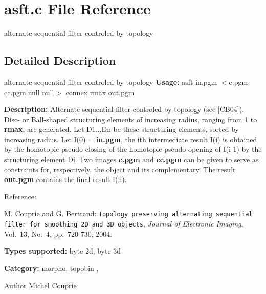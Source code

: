 \section{asft.c File Reference}
\label{asft_8c}


alternate sequential filter controled by topology  




\subsection{Detailed Description}
alternate sequential filter controled by topology {\bfseries Usage:} asft in.pgm $<$c.pgm cc.pgm$|$null null$>$ connex rmax out.pgm

{\bfseries Description:} Alternate sequential filter controled by topology (see [CB04]). Disc-\/ or Ball-\/shaped structuring elements of increasing radius, ranging from 1 to {\bfseries rmax}, are generated. Let D1...Dn be these structuring elements, sorted by increasing radius. Let I(0) = {\bfseries in.pgm}, the ith intermediate result I(i) is obtained by the homotopic pseudo-\/closing of the homotopic pseudo-\/opening of I(i-\/1) by the structuring element Di. Two images {\bfseries c.pgm} and {\bfseries cc.pgm} can be given to serve as constraints for, respectively, the object and its complementary. The result {\bfseries out.pgm} contains the final result I(n).

Reference:\par
 [CB04] M. Couprie and G. Bertrand: {\tt Topology preserving alternating sequential filter for smoothing 2D and 3D objects}, {\itshape  Journal of Electronic Imaging\/}, Vol.~13, No.~4, pp.~720-\/730, 2004.

{\bfseries Types supported:} byte 2d, byte 3d

{\bfseries Category:} morpho, topobin ,

\begin{DoxyAuthor}{Author}
Michel Couprie 
\end{DoxyAuthor}
